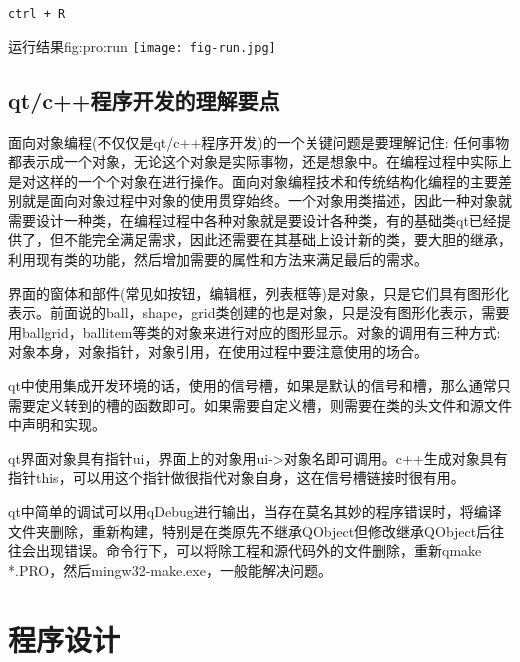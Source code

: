 \documentclass[11pt,twoside]{article} %
\begin{document}
\begin{enumerate}
\lstinline!ctrl + R!

\begin{insertfigure}{运行结果}{fig:pro:run}{}%
  \centering
  \texttt{[image: fig-run.jpg]}
\end{insertfigure}
\end{enumerate}

\subsection{qt/c++程序开发的理解要点}

面向对象编程(不仅仅是qt/c++程序开发)的一个关键问题是要理解记住: 任何事物都表示成一个对象，无论这个对象是实际事物，还是想象中。在编程过程中实际上是对这样的一个个对象在进行操作。面向对象编程技术和传统结构化编程的主要差别就是面向对象过程中对象的使用贯穿始终。一个对象用类描述，因此一种对象就需要设计一种类，在编程过程中各种对象就是要设计各种类，有的基础类qt已经提供了，但不能完全满足需求，因此还需要在其基础上设计新的类，要大胆的继承，利用现有类的功能，然后增加需要的属性和方法来满足最后的需求。

界面的窗体和部件(常见如按钮，编辑框，列表框等)是对象，只是它们具有图形化表示。前面说的ball，shape，grid类创建的也是对象，只是没有图形化表示，需要用ballgrid，ballitem等类的对象来进行对应的图形显示。对象的调用有三种方式: 对象本身，对象指针，对象引用，在使用过程中要注意使用的场合。

qt中使用集成开发环境的话，使用的信号槽，如果是默认的信号和槽，那么通常只需要定义转到的槽的函数即可。如果需要自定义槽，则需要在类的头文件和源文件中声明和实现。

qt界面对象具有指针ui，界面上的对象用ui->对象名即可调用。c++生成对象具有指针this，可以用这个指针做很指代对象自身，这在信号槽链接时很有用。

qt中简单的调试可以用qDebug进行输出，当存在莫名其妙的程序错误时，将编译文件夹删除，重新构建，特别是在类原先不继承QObject但修改继承QObject后往往会出现错误。命令行下，可以将除工程和源代码外的文件删除，重新qmake *.PRO，然后mingw32-make.exe，一般能解决问题。


\section{程序设计}
\end{document}
